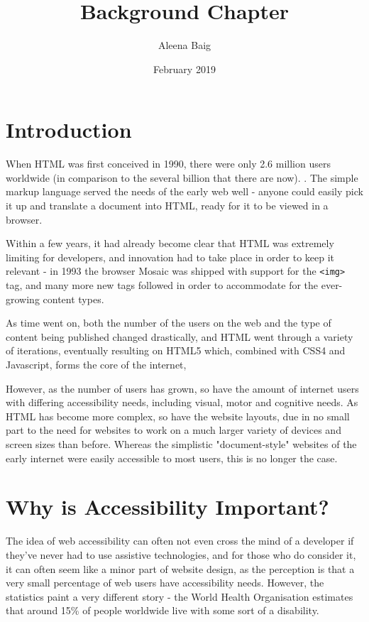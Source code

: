 \documentclass{article}
\title{Background Chapter}
\author{Aleena Baig }
\date{February 2019}
\begin{document}
\maketitle

\section{Introduction}
When HTML was first conceived in 1990, there were only 2.6 million users worldwide (in comparison to the several billion that there are now). \cite{ourworldindata:internet}. The simple markup language served the needs of the early web well - anyone could easily pick it up and translate a document into HTML, ready for it to be viewed in a browser.

Within a few years, it had already become clear that HTML was extremely limiting for developers, and innovation had to take place in order to keep it relevant - in 1993 the browser Mosaic was shipped with support for the \texttt{<img>} tag, and many more new tags followed in order to accommodate for the ever-growing content types. \cite{historyofhtml}

As time went on, both the number of the users on the web and the type of content being published changed drastically, and HTML went through a variety of iterations, eventually resulting on HTML5 which, combined with CSS4 and Javascript, forms the core of the internet,

However, as the number of users has grown, so have the amount of internet users with differing accessibility needs, including visual, motor and cognitive needs. As HTML has become more complex, so have the website layouts, due in no small part to the need for websites to work on a much larger variety of devices and screen sizes than before. Whereas the simplistic "document-style" websites of the early internet were easily accessible to most users, this is no longer the case.


\section{Why is Accessibility Important?}

The idea of web accessibility can often not even cross the mind of a developer if they've never had to use assistive technologies, and for those who do consider it, it can often seem like a minor part of website design, as the perception is that a very small percentage of web users have accessibility needs. However, the statistics paint a very different story - the World Health Organisation estimates that around 15\% of people worldwide live with some sort of a disability. \cite{WHOdisability}
\end{document}
